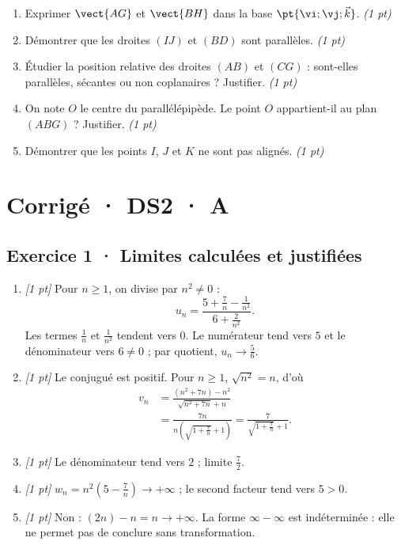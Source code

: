 \begin{enumerate}

\item Exprimer $\vect{AG}$ et $\vect{BH}$ dans la base $\pt{\vi;\vj;\vec k}$. \hfill\textit{(1 pt)}

\item Démontrer que les droites $(IJ)$ et $(BD)$ sont parallèles. \hfill\textit{(1 pt)}

\item Étudier la position relative des droites $(AB)$ et $(CG)$ : sont-elles parallèles, sécantes ou non coplanaires ? Justifier. \hfill\textit{(1 pt)}

\item On note $O$ le centre du parallélépipède. Le point $O$ appartient-il au plan $(ABG)$ ? Justifier. \hfill\textit{(1 pt)}

\item Démontrer que les points $I$, $J$ et $K$ ne sont pas alignés. \hfill\textit{(1 pt)}

\end{enumerate}

\ifmxteacher\mxnewpage

\section*{Corrigé · DS2 · A}\label{cor:2-3}

\subsection*{Exercice 1 · Limites calculées et justifiées}\begin{enumerate}

\item \textit{[1 pt]} Pour $n\ge1$, on divise par $n^2\ne0$ :
\[u_n=\frac{5+\frac{7}{n}-\frac{1}{n^2}}{6+\frac{2}{n^2}}.\]
Les termes $\frac{1}{n}$ et $\frac{1}{n^2}$ tendent vers $0$. Le numérateur tend vers $5$ et le dénominateur vers $6\ne0$ ; par quotient, $u_n\to\frac{5}{6}$.

\item \textit{[1 pt]} Le conjugué est positif. Pour $n\ge1$, $\sqrt{n^2}=n$, d'où
\[\begin{aligned}v_n&=\frac{(n^2+7n)-n^2}{\sqrt{n^2+7n}+n}\\&=\frac{7n}{n(\sqrt{1+\frac{7}{n}}+1)}=\frac{7}{\sqrt{1+\frac{7}{n}}+1}.\end{aligned}\]

\item \textit{[1 pt]} Le dénominateur tend vers $2$ ; limite $\frac{7}{2}$.

\item \textit{[1 pt]} $w_n=n^2(5-\frac{7}{n})\to+\infty$ ; le second facteur tend vers $5>0$.

\item \textit{[1 pt]} Non : $(2n)-n=n\to+\infty$. La forme $\infty-\infty$ est indéterminée : elle ne permet pas de conclure sans transformation.

\end{enumerate}

